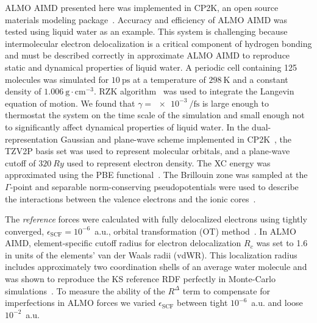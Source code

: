 \documentclass[aps,prl,reprint,amsmath,amssymb]{revtex4-1}
\begin{document}
ALMO AIMD presented here was implemented in CP2K, an open source materials modeling package~\cite{www:cp2k}. 
Accuracy and efficiency of ALMO AIMD was tested using liquid water as an example. 
This system is challenging because intermolecular electron delocalization is a critical component of hydrogen bonding and must be described correctly in approximate ALMO AIMD to reproduce static and dynamical properties of liquid water. 
A periodic cell containing 125 molecules was simulated for $\SI{10}{\ps}$ at a temperature of $\SI{298}{\K}$ and a constant density of $\SI{1.006}{\g\cdot\cm^{-3}}$. 
RZK algorithm~\cite{RZK} was used to integrate the Langevin equation of motion. We found that $\gamma = \SI{e-3}{\per\fs}$ is large enough to thermostat the system on the time scale of the simulation and small enough not to significantly affect dynamical properties of liquid water.
%
In the dual-representation Gaussian and plane-wave scheme implemented in CP2K~\cite{a:quickstep}, the TZV2P basis set was used to represent molecular orbitals, and a plane-wave cutoff of $\SI{320}{Ry}$ used to represent electron density. 
The XC energy was approximated using the PBE functional~\cite{a:PBEfunctional}. 
The Brillouin zone was sampled at the $\Gamma$-point and separable norm-conserving pseudopotentials were used to describe the interactions between the valence electrons and the ionic cores~\cite{a:hgh}. 

The \emph{reference} forces were calculated with fully delocalized electrons using tightly converged, $\epsilon_{\text{SCF}}=10^{-6}$~a.u., orbital transformation (OT) method~\cite{a:ot,a:ot2}. 
In ALMO AIMD, element-specific cutoff radius for electron delocalization $R_c$ was set to 1.6 in units of the elements' van der Waals radii (vdWR). This localization radius includes approximately two coordination shells of an average water molecule and was shown to reproduce the KS reference RDF perfectly in Monte-Carlo simulations~\cite{a:almo-ls}. 
%
To measure the ability of the $R^{\Delta}$ term to compensate for imperfections in ALMO forces we varied $\epsilon_{\text{SCF}}$ between tight $10^{-6}$~a.u. and loose $10^{-2}$~a.u. 

\end{document}
